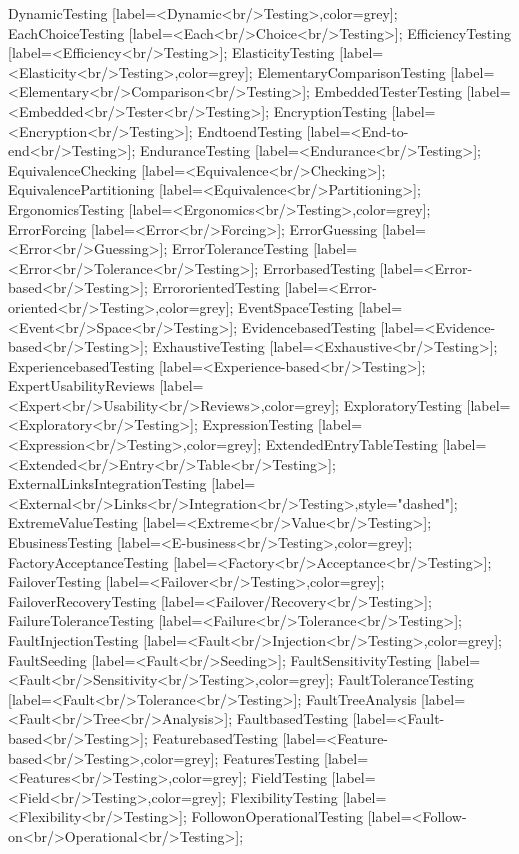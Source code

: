 \documentclass{article}
\begin{document}
{DynamicTesting [label=<Dynamic<br/>Testing>,color=grey];
EachChoiceTesting [label=<Each<br/>Choice<br/>Testing>];
EfficiencyTesting [label=<Efficiency<br/>Testing>];
ElasticityTesting [label=<Elasticity<br/>Testing>,color=grey];
ElementaryComparisonTesting [label=<Elementary<br/>Comparison<br/>Testing>];
EmbeddedTesterTesting [label=<Embedded<br/>Tester<br/>Testing>];
EncryptionTesting [label=<Encryption<br/>Testing>];
EndtoendTesting [label=<End-to-end<br/>Testing>];
EnduranceTesting [label=<Endurance<br/>Testing>];
EquivalenceChecking [label=<Equivalence<br/>Checking>];
EquivalencePartitioning [label=<Equivalence<br/>Partitioning>];
ErgonomicsTesting [label=<Ergonomics<br/>Testing>,color=grey];
ErrorForcing [label=<Error<br/>Forcing>];
ErrorGuessing [label=<Error<br/>Guessing>];
ErrorToleranceTesting [label=<Error<br/>Tolerance<br/>Testing>];
ErrorbasedTesting [label=<Error-based<br/>Testing>];
ErrororientedTesting [label=<Error-oriented<br/>Testing>,color=grey];
EventSpaceTesting [label=<Event<br/>Space<br/>Testing>];
EvidencebasedTesting [label=<Evidence-based<br/>Testing>];
ExhaustiveTesting [label=<Exhaustive<br/>Testing>];
ExperiencebasedTesting [label=<Experience-based<br/>Testing>];
ExpertUsabilityReviews [label=<Expert<br/>Usability<br/>Reviews>,color=grey];
ExploratoryTesting [label=<Exploratory<br/>Testing>];
ExpressionTesting [label=<Expression<br/>Testing>,color=grey];
ExtendedEntryTableTesting [label=<Extended<br/>Entry<br/>Table<br/>Testing>];
ExternalLinksIntegrationTesting [label=<External<br/>Links<br/>Integration<br/>Testing>,style="dashed"];
ExtremeValueTesting [label=<Extreme<br/>Value<br/>Testing>];
EbusinessTesting [label=<E-business<br/>Testing>,color=grey];
FactoryAcceptanceTesting [label=<Factory<br/>Acceptance<br/>Testing>];
FailoverTesting [label=<Failover<br/>Testing>,color=grey];
FailoverRecoveryTesting [label=<Failover/Recovery<br/>Testing>];
FailureToleranceTesting [label=<Failure<br/>Tolerance<br/>Testing>];
FaultInjectionTesting [label=<Fault<br/>Injection<br/>Testing>,color=grey];
FaultSeeding [label=<Fault<br/>Seeding>];
FaultSensitivityTesting [label=<Fault<br/>Sensitivity<br/>Testing>,color=grey];
FaultToleranceTesting [label=<Fault<br/>Tolerance<br/>Testing>];
FaultTreeAnalysis [label=<Fault<br/>Tree<br/>Analysis>];
FaultbasedTesting [label=<Fault-based<br/>Testing>];
FeaturebasedTesting [label=<Feature-based<br/>Testing>,color=grey];
FeaturesTesting [label=<Features<br/>Testing>,color=grey];
FieldTesting [label=<Field<br/>Testing>,color=grey];
FlexibilityTesting [label=<Flexibility<br/>Testing>];
FollowonOperationalTesting [label=<Follow-on<br/>Operational<br/>Testing>];
}
\end{document}
